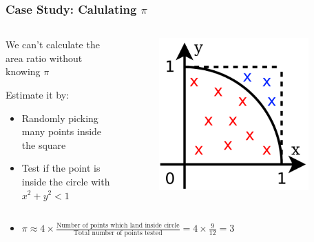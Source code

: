 \documentclass[14pt]{beamer}
\begin{document}
\begin{frame}
\frametitle{Case Study: Calulating $\pi$}
\begin{columns}
\begin{column}{0.6\textwidth}
\begin{itemize}
\small{
\item We can't calculate the area ratio without knowing $\pi$
\item Estimate it by:
\begin{itemize}
	\item Randomly picking many points inside the square
	\item Test if the point is inside the circle with $x^2 + y^2 < 1$
	\end{itemize}
}
\end{itemize}
\end{column}
\begin{column}{0.4\textwidth}
\begin{figure}
\includegraphics[width=0.9\textwidth]{pi-dots.png}
\end{figure}
\end{column}
\end{columns}
\begin{itemize}
\item $\pi \approx 4 \times \frac{\textrm{Number of points which land inside circle}}{\textrm{Total number of points tested}} = 4 \times \frac{9}{12} = 3$
\end{itemize}
\end{frame}
\end{document}
